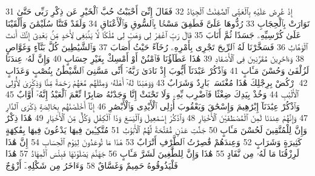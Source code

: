 {\tiny\colorbox{cl_aya}{31}} إِذْ عُرِضَ عَلَيْهِ بِٱلْعَشِىِّ ٱلصَّٰفِنَٰتُ ٱلْجِيَادُ
{\tiny\colorbox{cl_aya}{32}} فَقَالَ إِنِّىٓ أَحْبَبْتُ حُبَّ ٱلْخَيْرِ عَن ذِكْرِ رَبِّى حَتَّىٰ تَوَارَتْ بِٱلْحِجَابِ
{\tiny\colorbox{cl_aya}{33}} رُدُّوهَا عَلَىَّ فَطَفِقَ مَسْحًۢا بِٱلسُّوقِ وَٱلْأَعْنَاقِ
{\tiny\colorbox{cl_aya}{34}} وَلَقَدْ فَتَنَّا سُلَيْمَٰنَ وَأَلْقَيْنَا عَلَىٰ كُرْسِيِّهِۦ جَسَدًا ثُمَّ أَنَابَ
{\tiny\colorbox{cl_aya}{35}} قَالَ رَبِّ ٱغْفِرْ لِى وَهَبْ لِى مُلْكًا لَّا يَنۢبَغِى لِأَحَدٍ مِّنۢ بَعْدِىٓ إِنَّكَ أَنتَ ٱلْوَهَّابُ
{\tiny\colorbox{cl_aya}{36}} فَسَخَّرْنَا لَهُ ٱلرِّيحَ تَجْرِى بِأَمْرِهِۦ رُخَآءً حَيْثُ أَصَابَ
{\tiny\colorbox{cl_aya}{37}} وَٱلشَّيَٰطِينَ كُلَّ بَنَّآءٍ وَغَوَّاصٍ
{\tiny\colorbox{cl_aya}{38}} وَءَاخَرِينَ مُقَرَّنِينَ فِى ٱلْأَصْفَادِ
{\tiny\colorbox{cl_aya}{39}} هَٰذَا عَطَآؤُنَا فَٱمْنُنْ أَوْ أَمْسِكْ بِغَيْرِ حِسَابٍ
{\tiny\colorbox{cl_aya}{40}} وَإِنَّ لَهُۥ عِندَنَا لَزُلْفَىٰ وَحُسْنَ مَـَٔابٍ
{\tiny\colorbox{cl_aya}{41}} وَٱذْكُرْ عَبْدَنَآ أَيُّوبَ إِذْ نَادَىٰ رَبَّهُۥٓ أَنِّى مَسَّنِىَ ٱلشَّيْطَٰنُ بِنُصْبٍ وَعَذَابٍ
{\tiny\colorbox{cl_aya}{42}} ٱرْكُضْ بِرِجْلِكَ هَٰذَا مُغْتَسَلٌۢ بَارِدٌ وَشَرَابٌ
{\tiny\colorbox{cl_aya}{43}} وَوَهَبْنَا لَهُۥٓ أَهْلَهُۥ وَمِثْلَهُم مَّعَهُمْ رَحْمَةً مِّنَّا وَذِكْرَىٰ لِأُو۟لِى ٱلْأَلْبَٰبِ
{\tiny\colorbox{cl_aya}{44}} وَخُذْ بِيَدِكَ ضِغْثًا فَٱضْرِب بِّهِۦ وَلَا تَحْنَثْ إِنَّا وَجَدْنَٰهُ صَابِرًا نِّعْمَ ٱلْعَبْدُ إِنَّهُۥٓ أَوَّابٌ
{\tiny\colorbox{cl_aya}{45}} وَٱذْكُرْ عِبَٰدَنَآ إِبْرَٰهِيمَ وَإِسْحَٰقَ وَيَعْقُوبَ أُو۟لِى ٱلْأَيْدِى وَٱلْأَبْصَٰرِ
{\tiny\colorbox{cl_aya}{46}} إِنَّآ أَخْلَصْنَٰهُم بِخَالِصَةٍ ذِكْرَى ٱلدَّارِ
{\tiny\colorbox{cl_aya}{47}} وَإِنَّهُمْ عِندَنَا لَمِنَ ٱلْمُصْطَفَيْنَ ٱلْأَخْيَارِ
{\tiny\colorbox{cl_aya}{48}} وَٱذْكُرْ إِسْمَٰعِيلَ وَٱلْيَسَعَ وَذَا ٱلْكِفْلِ وَكُلٌّ مِّنَ ٱلْأَخْيَارِ
{\tiny\colorbox{cl_aya}{49}} هَٰذَا ذِكْرٌ وَإِنَّ لِلْمُتَّقِينَ لَحُسْنَ مَـَٔابٍ
{\tiny\colorbox{cl_aya}{50}} جَنَّٰتِ عَدْنٍ مُّفَتَّحَةً لَّهُمُ ٱلْأَبْوَٰبُ
{\tiny\colorbox{cl_aya}{51}} مُتَّكِـِٔينَ فِيهَا يَدْعُونَ فِيهَا بِفَٰكِهَةٍ كَثِيرَةٍ وَشَرَابٍ
{\tiny\colorbox{cl_aya}{52}} وَعِندَهُمْ قَٰصِرَٰتُ ٱلطَّرْفِ أَتْرَابٌ
{\tiny\colorbox{cl_aya}{53}} هَٰذَا مَا تُوعَدُونَ لِيَوْمِ ٱلْحِسَابِ
{\tiny\colorbox{cl_aya}{54}} إِنَّ هَٰذَا لَرِزْقُنَا مَا لَهُۥ مِن نَّفَادٍ
{\tiny\colorbox{cl_aya}{55}} هَٰذَا وَإِنَّ لِلطَّٰغِينَ لَشَرَّ مَـَٔابٍ
{\tiny\colorbox{cl_aya}{56}} جَهَنَّمَ يَصْلَوْنَهَا فَبِئْسَ ٱلْمِهَادُ
{\tiny\colorbox{cl_aya}{57}} هَٰذَا فَلْيَذُوقُوهُ حَمِيمٌ وَغَسَّاقٌ
{\tiny\colorbox{cl_aya}{58}} وَءَاخَرُ مِن شَكْلِهِۦٓ أَزْوَٰجٌ
